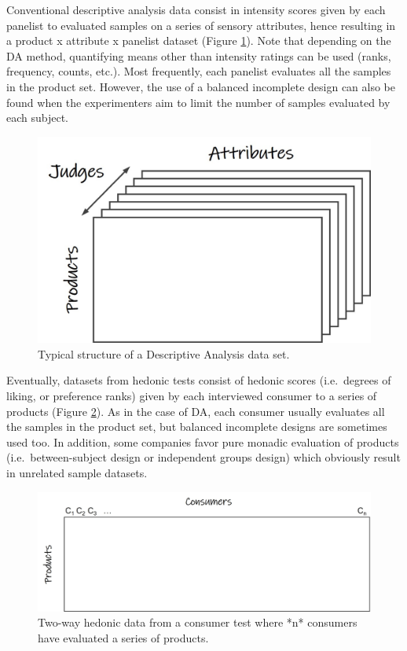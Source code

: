 \documentclass[
]{krantz}
\begin{document}
Conventional descriptive analysis data consist in intensity scores given by each panelist to evaluated samples on a series of sensory attributes, hence resulting in a product x attribute x panelist dataset (Figure \ref{fig:DAdata}). Note that depending on the DA method, quantifying means other than intensity ratings can be used (ranks, frequency, counts, etc.). Most frequently, each panelist evaluates all the samples in the product set. However, the use of a balanced incomplete design can also be found when the experimenters aim to limit the number of samples evaluated by each subject.

\begin{figure}
\includegraphics[width=0.9\linewidth]{images/DA_data} \caption{Typical structure of a Descriptive Analysis data set.}\label{fig:DAdata}
\end{figure}

Eventually, datasets from hedonic tests consist of hedonic scores (i.e.~degrees of liking, or preference ranks) given by each interviewed consumer to a series of products (Figure \ref{fig:hedodata}). As in the case of DA, each consumer usually evaluates all the samples in the product set, but balanced incomplete designs are sometimes used too. In addition, some companies favor pure monadic evaluation of products (i.e.~between-subject design or independent groups design) which obviously result in unrelated sample datasets.

\begin{figure}
\includegraphics[width=0.9\linewidth]{images/hedo_data} \caption{Two-way hedonic data from a consumer test where *n* consumers have evaluated a series of products.}\label{fig:hedodata}
\end{figure}
\end{document}

